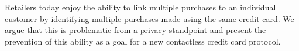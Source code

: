 Retailers today enjoy the ability to link multiple purchases to an individual customer by identifying multiple purchases made using the same credit card.
We argue that this is problematic from a privacy standpoint and present the prevention of this ability as a goal for a new contactless credit card protocol.